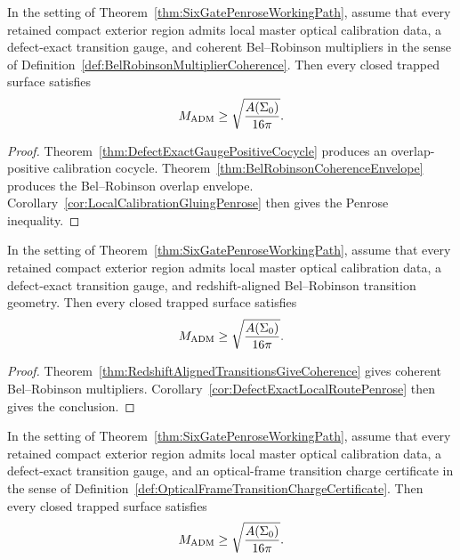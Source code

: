 \begin{corollary}\label{cor:DefectExactLocalRoutePenrose}
In the setting of Theorem~\ref{thm:SixGatePenroseWorkingPath}, assume that every retained compact exterior region admits local master optical calibration data, a defect-exact transition gauge, and coherent Bel--Robinson multipliers in the sense of Definition~\ref{def:BelRobinsonMultiplierCoherence}. Then every closed trapped surface satisfies
\[
    M_{\mathrm{ADM}}\ge \sqrt{\frac{A(\Sigma_0)}{16\pi}} .
\]
\end{corollary}

\begin{proof}
Theorem~\ref{thm:DefectExactGaugePositiveCocycle} produces an overlap-positive calibration cocycle. Theorem~\ref{thm:BelRobinsonCoherenceEnvelope} produces the Bel--Robinson overlap envelope. Corollary~\ref{cor:LocalCalibrationGluingPenrose} then gives the Penrose inequality.
\end{proof}

\begin{corollary}\label{cor:RedshiftAlignedDefectExactRoutePenrose}
In the setting of Theorem~\ref{thm:SixGatePenroseWorkingPath}, assume that every retained compact exterior region admits local master optical calibration data, a defect-exact transition gauge, and redshift-aligned Bel--Robinson transition geometry. Then every closed trapped surface satisfies
\[
    M_{\mathrm{ADM}}\ge \sqrt{\frac{A(\Sigma_0)}{16\pi}} .
\]
\end{corollary}

\begin{proof}
Theorem~\ref{thm:RedshiftAlignedTransitionsGiveCoherence} gives coherent Bel--Robinson multipliers. Corollary~\ref{cor:DefectExactLocalRoutePenrose} then gives the conclusion.
\end{proof}

\begin{corollary}\label{cor:OpticalFrameChargeDefectExactRoutePenrose}
In the setting of Theorem~\ref{thm:SixGatePenroseWorkingPath}, assume that every retained compact exterior region admits local master optical calibration data, a defect-exact transition gauge, and an optical-frame transition charge certificate in the sense of Definition~\ref{def:OpticalFrameTransitionChargeCertificate}. Then every closed trapped surface satisfies
\[
    M_{\mathrm{ADM}}\ge \sqrt{\frac{A(\Sigma_0)}{16\pi}} .
\]
\end{corollary}

